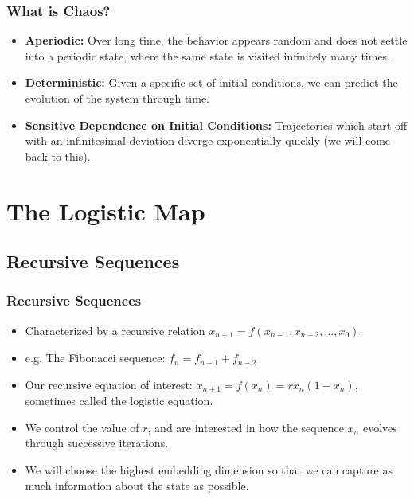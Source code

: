 \documentclass[9pt]{beamer}
\begin{document}
\begin{frame}
	\frametitle{What is Chaos?}

	\begin{itemize}
		\item \textbf{Aperiodic:} Over long time, the behavior appears 
			random and does not settle into a periodic state, where the same state is
			visited infinitely many times. 
		\item \textbf{Deterministic:} Given a specific set of initial
			conditions, we can predict the evolution of the system 
			through time. 
		\item \textbf{Sensitive Dependence on Initial Conditions:} 
			Trajectories which start off with an infinitesimal deviation 
			diverge exponentially quickly (we will come back to this). 
	\end{itemize}
\end{frame}

\section{The Logistic Map}

\subsection{Recursive Sequences}
\begin{frame}
	\frametitle{Recursive Sequences}
	\begin{itemize}
		\item Characterized by a recursive relation \( x_{n+1} = f(x_{n-1}, 
			x_{n - 2}, \dots,  x_0) \). 
		\item e.g. The Fibonacci sequence: \( f_n = f_{n - 1} + f_{n - 2} \)
		\item Our recursive equation of interest: \( x_{n+1} = 
			f(x_n) = rx_n(1 - x_n) \), 
			sometimes called the logistic equation.
		\item We control the value of \( r \), and are interested in how 
			the sequence \( x_n \) evolves through successive 
			iterations. 
		\item We will choose the highest embedding dimension so that we can capture
			as much information about the state as possible. 
	\end{itemize}
\end{frame}
\end{document}
